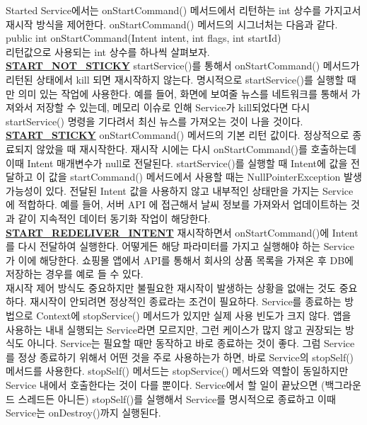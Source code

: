 Started Service에서는 onStartCommand() 메서드에서 리턴하는 int 상수를 가지고서 재시작 방식을 제어한다. onStartCommand() 메서드의 시그너처는 다음과 같다.\\

public int onStartCommand(Intent intent, int flags, int startId)\\

리턴값으로 사용되는 int 상수를 하나씩 살펴보자.\\
\underline{\bfseries START\_NOT\_STICKY} startService()를 통해서 onStartCommand() 메서드가 리턴된 상태에서 kill 되면 재시작하지 않는다. 명시적으로 startService()를 실행할 때만 의미 있는 작업에 사용한다.
예를 들어, 화면에 보여줄 뉴스를 네트워크를 통해서 가져와서 저장할 수 있는데, 메모리 이슈로 인해 Service가 kill되었다면 다시 startService() 명령을 기다려서 최신 뉴스를 가져오는 것이 나을 것이다.\\

\underline{\bfseries START\_STICKY} onStartCommand() 메서드의 기본 리턴 값이다. 정상적으로 종료되지 않았을 때 재시작한다. 재시작 시에는 다시 onStartCommand()를 호출하는데 이때 Intent 매개변수가 null로 전달된다.
startService()를 실행할 때 Intent에 값을 전달하고 이 값을 startCommand() 메서드에서 사용할 때는 NullPointerException 발생 가능성이 있다. 
전달된 Intent 값을 사용하지 않고 내부적인 상태만을 가지는 Service에 적합하다.
예를 들어, 서버 API 에 접근해서 날씨 정보를 가져와서 업데이트하는 것과 같이 지속적인 데이터 동기화 작업이 해당한다.\\

\underline{\bfseries START\_REDELIVER\_INTENT} 재시작하면서 onStartCommand()에 Intent를 다시 전달하여 실행한다. 어떻게든 해당 파라미터를 가지고 실행해야 하는 Service가 이에 해당한다. 쇼핑몰 앱에서 API를 통해서 회사의 상품 목록을 가져온 후 DB에 저장하는 경우를 예로 들 수 있다.\\

재시작 제어 방식도 중요하지만 불필요한 재시작이 발생하는 상황을 없애는 것도 중요하다. 재시작이 안되려면 정상적인 종료라는 조건이 필요하다. 
Service를 종료하는 방법으로 Context에 stopService() 메서드가 있지만 실제 사용 빈도가 크지 않다. 
앱을 사용하는 내내 실행되는 Service라면 모르지만, 그런 케이스가 많지 않고 권장되는 방식도 아니다. 
Service는 필요할 때만 동작하고 바로 종료하는 것이 좋다.
그럼 Service를 정상 종료하기 위해서 어떤 것을 주로 사용하는가 하면, 바로 Service의 stopSelf() 메서드를 사용한다. 
stopSelf() 메서드는 stopService() 메서드와 역할이 동일하지만 Service 내에서 호출한다는 것이 다를 뿐이다. Service에서 할 일이 끝났으면 (백그라운드 스레드든 아니든) stopSelf()를 실행해서 Service를 명시적으로 종료하고 이때 Service는 onDestroy()까지 실행된다.\\


